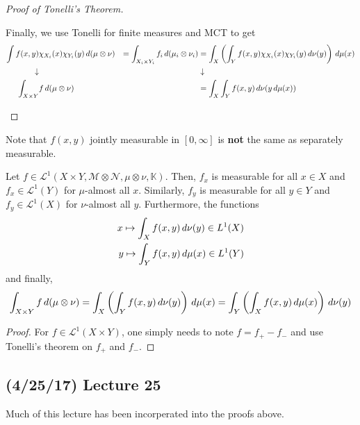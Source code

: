 \documentclass[11pt,leqno,oneside]{amsbook}
\numberwithin{thm}{section}
\renewcommand{\A}{\mathcal{A}} %
\newcommand{\M}{\mathcal{M}} %
\newcommand{\Ep}{\mathcal{E}} %
\newcommand{\cL}{\mathcal{L}}
\newcommand{\cN}{\mathcal{N}}
\newcommand{\cC}{\mathcal{C}} %
\newcommand{\K}{\mathbb{K}} %
\newcommand{\ox}{\otimes}
\renewcommand{\de}{\textbf} %
\begin{document}
\begin{proof}[Proof of Tonelli's Theorem]
\begin{itemize}
    Finally, we use Tonelli for finite measures and MCT to get
    \begin{align*}
      \int f(x,y) &\chi_{X_i}(x)\chi_{Y_i}(y) \d(\mu \ox \nu)
      & =\int_{X_i \times Y_i} f_i \d(\mu_i \ox \nu_i)
      &  = \int_X  \left(\int_Y f(x,y) \chi_{X_i}(x) \chi_{Y_i}(y)
        \d\nu(y)\right) \d\mu(x) \\
      \downarrow & &&  \downarrow \\
      \int_{X \times Y} & f \d(\mu \ox \nu)
       && = \int_X  \int_Y f(x,y)\d\nu(y \d\mu(x))
    \end{align*}
  \end{itemize}
\end{proof}
\begin{rmk}
  Note that \(f(x,y)\) jointly measurable in \([0,\infty]\) is
  \de{not} the same as separately measurable.
\end{rmk}
\begin{thm}
  Let \(f \in \cL^1(X\times Y, \M \ox \cN, \mu \ox \nu, \K)\). Then,
  \(f_x\) is measurable for all \(x \in X\)  and \(f_x \in \cL^1(Y)\)
  for \(\mu\)-almost all \(x\). Similarly, \(f_y\) is measurable for
  all \(y \in Y\) and \(f_y \in \cL^1(X)\) for \(\nu\)-almost all
  \(y\). Furthermore, the functions
  \begin{align*}
    x \mapsto \int_X f(x,y) \, d\nu(y) \in L^1(X) \\
    y \mapsto \int_Y f(x,y) \, d\mu(x) \in L^1(Y)
  \end{align*}
  and finally, \[
    \int_{X \times Y} f \d(\mu \ox \nu) = \int_X \left( \int_Y f(x,y)
      \d\nu(y) \right) \d\mu(x) = \int_Y \left( \int_X f(x,y) \d\mu(x)
    \right) \d\nu(y)
  \]
\end{thm}
\begin{proof}
  For \(f \in \cL^1(X \times Y)\), one simply needs to note \(f = f_+
  - f_-\) and use Tonelli's theorem on \(f_+\) and \(f_-\).
\end{proof}

\subsection*{(4/25/17) Lecture 25}
Much of this lecture has been incorperated into the proofs above.
\end{document}
